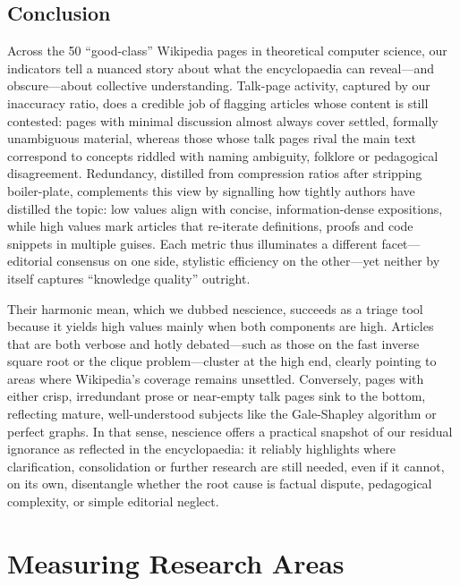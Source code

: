 \subsection{Conclusion}

Across the 50 “good-class” Wikipedia pages in theoretical computer science, our indicators tell a nuanced story about what the encyclopaedia can reveal—and obscure—about collective understanding.  Talk-page activity, captured by our inaccuracy ratio, does a credible job of flagging articles whose content is still contested: pages with minimal discussion almost always cover settled, formally unambiguous material, whereas those whose talk pages rival the main text correspond to concepts riddled with naming ambiguity, folklore or pedagogical disagreement. Redundancy, distilled from compression ratios after stripping boiler-plate, complements this view by signalling how tightly authors have distilled the topic: low values align with concise, information-dense expositions, while high values mark articles that re-iterate definitions, proofs and code snippets in multiple guises.  Each metric thus illuminates a different facet—editorial consensus on one side, stylistic efficiency on the other—yet neither by itself captures “knowledge quality” outright.

Their harmonic mean, which we dubbed nescience, succeeds as a triage tool because it yields high values mainly when both components are high. Articles that are both verbose and hotly debated—such as those on the fast inverse square root or the clique problem—cluster at the high end, clearly pointing to areas where Wikipedia's coverage remains unsettled. Conversely, pages with either crisp, irredundant prose or near-empty talk pages sink to the bottom, reflecting mature, well-understood subjects like the Gale-Shapley algorithm or perfect graphs. In that sense, nescience offers a practical snapshot of our residual ignorance as reflected in the encyclopaedia: it reliably highlights where clarification, consolidation or further research are still needed, even if it cannot, on its own, disentangle whether the root cause is factual dispute, pedagogical complexity, or simple editorial neglect.

%
%

\section{Measuring Research Areas}
\label{sec:measuring_research_areas}

